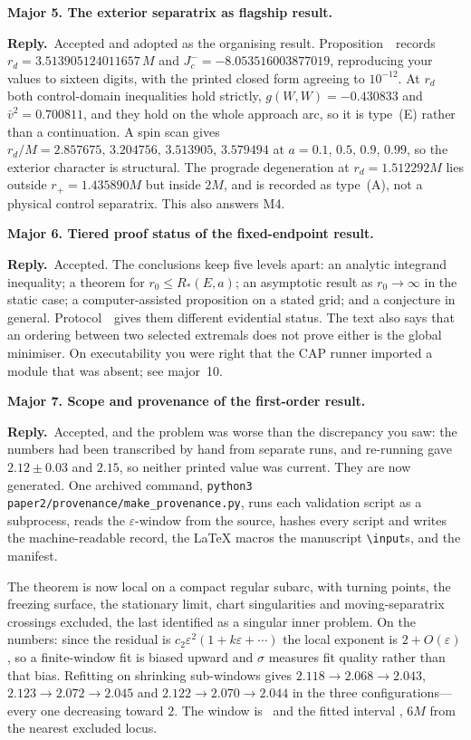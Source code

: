 \documentclass[11pt]{article}
\newcommand{\reply}{\par\noindent\textbf{Reply.}\ }
\newcommand{\R}[1]{\par\medskip\noindent\textbf{#1}\par\nopagebreak}
\begin{document}
\R{Major 5. The exterior separatrix as flagship result.}
\reply Accepted and adopted as the organising result.
Proposition~\msPropExteriorSep\ records $r_d=3.513905124011657\,M$ and
$J_c^-=-8.053516003877019$, reproducing your values to sixteen digits, with the
printed closed form agreeing to $10^{-12}$. At $r_d$ both control-domain
inequalities hold strictly, $g(W,W)=-0.430833$ and $\bar v^2=0.700811$, and they
hold on the whole approach arc, so it is type~(E) rather than a continuation. A spin
scan gives $r_d/M=2.857675,\,3.204756,\,3.513905,\,3.579494$ at
$a=0.1,\,0.5,\,0.9,\,0.99$, so the exterior character is structural. The prograde
degeneration at $r_d=1.512292M$ lies outside $r_+=1.435890M$ but inside $2M$, and is
recorded as type~(A), not a physical control separatrix. This also answers M4.

\R{Major 6. Tiered proof status of the fixed-endpoint result.}
\reply Accepted. The conclusions keep five levels apart: an analytic integrand
inequality; a theorem for $r_0\le R_*(E,a)$; an asymptotic result as
$r_0\to\infty$ in the static case; a computer-assisted proposition on a stated grid;
and a conjecture in general. Protocol~\msProtEvidence\ gives them different
evidential status. The text also says that an ordering between two selected
extremals does not prove either is the global minimiser. On executability you were
right that the CAP runner imported a module that was absent; see major~10.

\R{Major 7. Scope and provenance of the first-order result.}
\reply Accepted, and the problem was worse than the discrepancy you saw: the
numbers had been transcribed by hand from separate runs, and re-running gave
$2.12\pm0.03$ and $2.15$, so neither printed value was current. They are now
generated. One archived command,
\texttt{python3 paper2/provenance/make\_provenance.py}, runs each validation script
as a subprocess, reads the $\varepsilon$-window from the source, hashes every script
and writes the machine-readable record, the \LaTeX{} macros the manuscript
\texttt{\textbackslash input}s, and the manifest.

The theorem is now local on a compact regular subarc, with turning points, the
freezing surface, the stationary limit, chart singularities and moving-separatrix
crossings excluded, the last identified as a singular inner problem. On the numbers:
since the residual is $c_2\varepsilon^2(1+k\varepsilon+\cdots)$ the local exponent
is $2+O(\varepsilon)$, so a finite-window fit is biased upward and $\sigma$ measures
fit quality rather than that bias. Refitting on shrinking sub-windows gives
$2.118\to2.068\to2.043$, $2.123\to2.072\to2.045$ and $2.122\to2.070\to2.044$ in the
three configurations---every one decreasing toward $2$. The window is
\provEpsWindow\ and the fitted interval \provFitInterval, $6M$ from the nearest
excluded locus.
\end{document}
